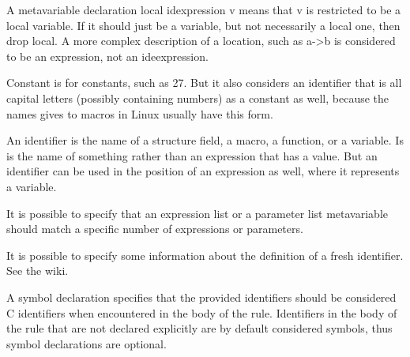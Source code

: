 \begin{grammar}
\end{grammar}

A metavariable declaration local idexpression v means that v is restricted
to be a local variable.  If it should just be a variable, but not
necessarily a local one, then drop local.  A more complex description of a
location, such as a->b is considered to be an expression, not an
ideexpression.

Constant is for constants, such as 27.  But it also considers an identifier
that is all capital letters (possibly containing numbers) as a constant as
well, because the names gives to macros in Linux usually have this form.

An identifier is the name of a structure field, a macro, a function, or a
variable.  Is is the name of something rather than an expression that has a
value.  But an identifier can be used in the position of an expression as
well, where it represents a variable.

It is possible to specify that an expression list or a parameter list
metavariable should match a specific number of expressions or parameters.

It is possible to specify some information about the definition of a fresh
identifier.  See the wiki.

A symbol declaration specifies that the provided identifiers should be
considered C identifiers when encountered in the body of the rule.
Identifiers in the body of the rule that are not declared explicitly are
by default considered symbols, thus symbol declarations are optional.

